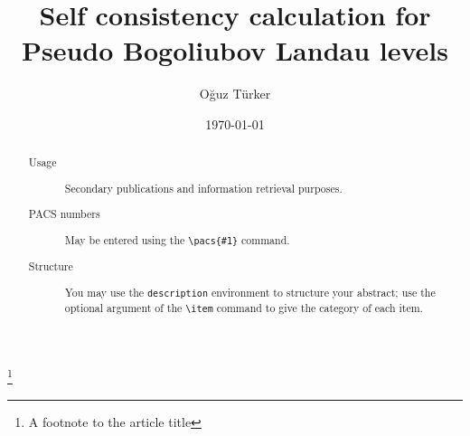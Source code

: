 \documentclass[%
 preprint,
 amsmath,amssymb,
 aps,
]{revtex4-1}
\begin{document}

\title{Self consistency calculation for Pseudo Bogoliubov Landau levels}%
\thanks{A footnote to the article title}%

\author{O\u{g}uz T\"{u}rker}


%

\date{\today}%

\begin{abstract}
\begin{description}
\item[Usage]
Secondary publications and information retrieval purposes.
\item[PACS numbers]
May be entered using the \verb+\pacs{#1}+ command.
\item[Structure]
You may use the \texttt{description} environment to structure your abstract;
use the optional argument of the \verb+\item+ command to give the category of each item. 
\end{description}
\end{abstract}
\end{document}
